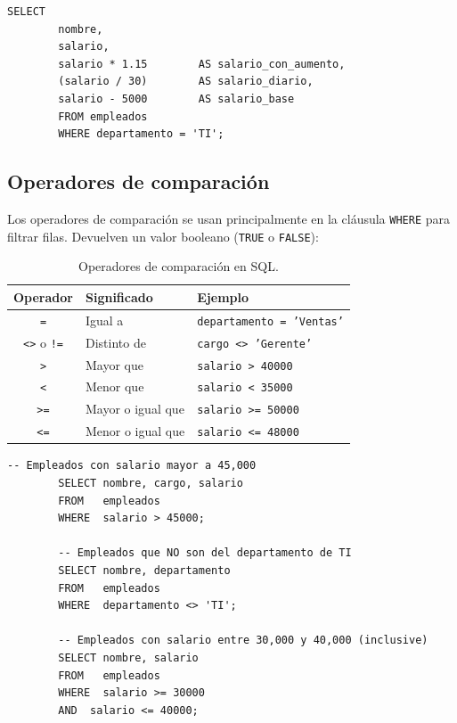 \documentclass[12pt, a4paper]{article}
\begin{document}
	\begin{lstlisting}[caption={Uso de operadores aritméticos.}]
		SELECT
		nombre,
		salario,
		salario * 1.15        AS salario_con_aumento,
		(salario / 30)        AS salario_diario,
		salario - 5000        AS salario_base
		FROM empleados
		WHERE departamento = 'TI';
	\end{lstlisting}
	
	\subsection{Operadores de comparación}
	
	Los operadores de comparación se usan principalmente en la cláusula
	\texttt{WHERE} para filtrar filas.
	Devuelven un valor booleano (\texttt{TRUE} o \texttt{FALSE}):
	
	\begin{table}[H]
		\centering
		\small
		\renewcommand{\arraystretch}{1.4}
		\begin{tabularx}{\linewidth}{@{} c l X @{}}
			\toprule
			\textbf{Operador} & \textbf{Significado} & \textbf{Ejemplo} \\
			\midrule
			\texttt{=}    & Igual a              & \texttt{departamento = 'Ventas'} \\
			\texttt{<>} o \texttt{!=} & Distinto de & \texttt{cargo <> 'Gerente'} \\
			\texttt{>}    & Mayor que            & \texttt{salario > 40000} \\
			\texttt{<}    & Menor que            & \texttt{salario < 35000} \\
			\texttt{>=}   & Mayor o igual que    & \texttt{salario >= 50000} \\
			\texttt{<=}   & Menor o igual que    & \texttt{salario <= 48000} \\
			\bottomrule
		\end{tabularx}
		\caption{Operadores de comparación en SQL.}
		\label{tab:operadores-comparacion}
	\end{table}
	
	\begin{lstlisting}[caption={Filtros con operadores de comparación.}]
		-- Empleados con salario mayor a 45,000
		SELECT nombre, cargo, salario
		FROM   empleados
		WHERE  salario > 45000;
		
		-- Empleados que NO son del departamento de TI
		SELECT nombre, departamento
		FROM   empleados
		WHERE  departamento <> 'TI';
		
		-- Empleados con salario entre 30,000 y 40,000 (inclusive)
		SELECT nombre, salario
		FROM   empleados
		WHERE  salario >= 30000
		AND  salario <= 40000;
	\end{lstlisting}
	
\end{document}

